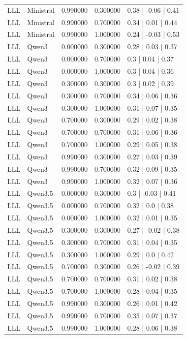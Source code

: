 \begin{longtable}{lllll}
LLL & Ministral & 0.990000 & 0.300000 & 0.38 | -0.06 | 0.41 \\
LLL & Ministral & 0.990000 & 0.700000 & 0.34 | 0.01 | 0.44 \\
LLL & Ministral & 0.990000 & 1.000000 & 0.24 | -0.03 | 0.53 \\
LLL & Qwen3 & 0.000000 & 0.300000 & 0.28 | 0.03 | 0.37 \\
LLL & Qwen3 & 0.000000 & 0.700000 & 0.3 | 0.04 | 0.37 \\
LLL & Qwen3 & 0.000000 & 1.000000 & 0.3 | 0.04 | 0.36 \\
LLL & Qwen3 & 0.300000 & 0.300000 & 0.3 | 0.02 | 0.39 \\
LLL & Qwen3 & 0.300000 & 0.700000 & 0.34 | 0.06 | 0.36 \\
LLL & Qwen3 & 0.300000 & 1.000000 & 0.31 | 0.07 | 0.35 \\
LLL & Qwen3 & 0.700000 & 0.300000 & 0.29 | 0.02 | 0.38 \\
LLL & Qwen3 & 0.700000 & 0.700000 & 0.31 | 0.06 | 0.36 \\
LLL & Qwen3 & 0.700000 & 1.000000 & 0.29 | 0.05 | 0.38 \\
LLL & Qwen3 & 0.990000 & 0.300000 & 0.27 | 0.03 | 0.39 \\
LLL & Qwen3 & 0.990000 & 0.700000 & 0.32 | 0.09 | 0.35 \\
LLL & Qwen3 & 0.990000 & 1.000000 & 0.32 | 0.07 | 0.36 \\
LLL & Qwen3.5 & 0.000000 & 0.300000 & 0.3 | -0.03 | 0.41 \\
LLL & Qwen3.5 & 0.000000 & 0.700000 & 0.32 | 0.0 | 0.38 \\
LLL & Qwen3.5 & 0.000000 & 1.000000 & 0.32 | 0.01 | 0.35 \\
LLL & Qwen3.5 & 0.300000 & 0.300000 & 0.27 | -0.02 | 0.38 \\
LLL & Qwen3.5 & 0.300000 & 0.700000 & 0.31 | 0.04 | 0.35 \\
LLL & Qwen3.5 & 0.300000 & 1.000000 & 0.29 | 0.0 | 0.42 \\
LLL & Qwen3.5 & 0.700000 & 0.300000 & 0.26 | -0.02 | 0.39 \\
LLL & Qwen3.5 & 0.700000 & 0.700000 & 0.31 | 0.02 | 0.38 \\
LLL & Qwen3.5 & 0.700000 & 1.000000 & 0.28 | 0.04 | 0.35 \\
LLL & Qwen3.5 & 0.990000 & 0.300000 & 0.26 | 0.01 | 0.42 \\
LLL & Qwen3.5 & 0.990000 & 0.700000 & 0.35 | 0.07 | 0.37 \\
LLL & Qwen3.5 & 0.990000 & 1.000000 & 0.28 | 0.06 | 0.38 \\

\end{longtable}
